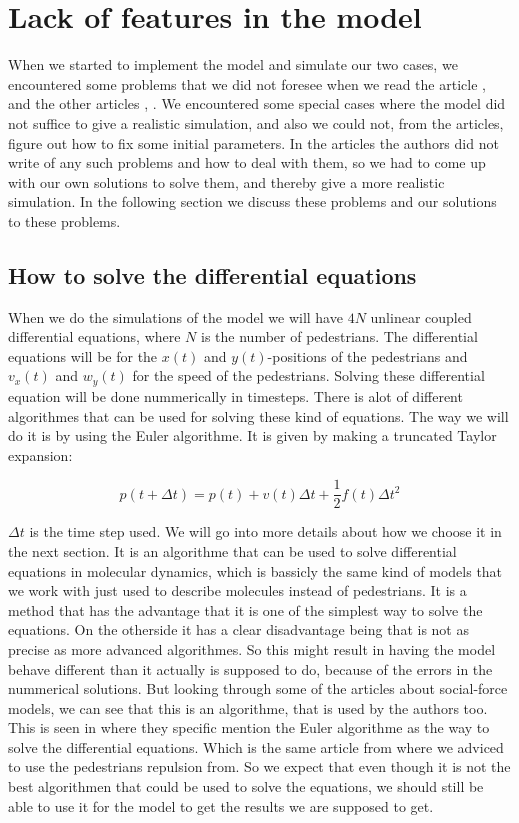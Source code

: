 \section{Lack of features in the model}

\label{sec:lack}
When we started to implement the model and simulate our two cases, we encountered some
problems that we did not foresee when we read the article \cite{self-org}, and the other
articles \cite{helbing00}, \cite{social-force}.
We encountered some special cases where the model did not suffice to give a realistic
simulation, and also we could not, from the articles, figure out how to fix some initial parameters.
In the articles the authors did not write of any such problems and how to deal with them,
so we had to come up with our own solutions to solve them, and thereby give a more realistic
simulation.
In the following section we discuss these problems and our solutions to these problems.

\subsection{How to solve the differential equations}

When we do the simulations of the model we will have $4N$ unlinear coupled differential equations, where $N$ is the number of pedestrians. The differential equations will be for the $x(t)$ and $y(t)$-positions of the pedestrians and $v_x(t)$ and $w_y(t)$ for the speed of the pedestrians. Solving these differential equation will be done nummerically in timesteps. There is alot of different algorithmes that can be used for solving these kind of equations. The way we will do it is by using the Euler algorithme. It is given by making a truncated Taylor expansion\cite{MD}:

\begin{equation}
p(t+\Delta t)=p(t)+v(t)\Delta t + \frac{1}{2}f(t)\Delta t^2
\end{equation}     

$\Delta t$ is the time step used. We will go into more details about how we choose it in the next section. 
It is an algorithme that can be used to solve differential equations in molecular dynamics, which is bassicly the same kind of models that we work with just used to describe molecules instead of pedestrians\cite{social-force}. It is a method that has the advantage that it is one of the simplest way to solve the equations.  On the otherside it has a clear disadvantage being that is not as precise as more advanced algorithmes\cite{MD}. So this might result in having the model behave different than it actually is supposed to do, because of the errors in the nummerical solutions. But looking through some of the articles about social-force models, we can see that this is an algorithme, that is used by the authors too. This is seen in \cite{ABconstant} where they specific mention the Euler algorithme as the way to solve the differential equations. Which is the same article from where we adviced to use the pedestrians repulsion from. So we expect that even though it is not the best algorithmen that could be used to solve the equations, we should still be able to use it for the model to get the results we are supposed to get.  


